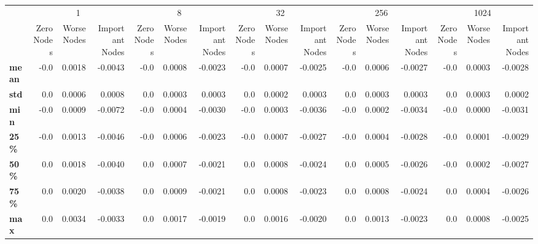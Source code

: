 \begin{tabular}{lrrrrrrrrrrrrrrr}
\toprule
{} & \multicolumn{3}{c}{1} & \multicolumn{3}{c}{8} & \multicolumn{3}{c}{32} & \multicolumn{3}{c}{256} & \multicolumn{3}{c}{1024} \\
{} & Zero Nodes & Worse Nodes & Important Nodes & Zero Nodes & Worse Nodes & Important Nodes & Zero Nodes & Worse Nodes & Important Nodes & Zero Nodes & Worse Nodes & Important Nodes & Zero Nodes & Worse Nodes & Important Nodes \\
\midrule
\textbf{mean} &       -0.0 &      0.0018 &         -0.0043 &       -0.0 &      0.0008 &         -0.0023 &       -0.0 &      0.0007 &         -0.0025 &       -0.0 &      0.0006 &         -0.0027 &       -0.0 &      0.0003 &         -0.0028 \\
\textbf{std } &        0.0 &      0.0006 &          0.0008 &        0.0 &      0.0003 &          0.0003 &        0.0 &      0.0002 &          0.0003 &        0.0 &      0.0003 &          0.0003 &        0.0 &      0.0003 &          0.0002 \\
\textbf{min } &       -0.0 &      0.0009 &         -0.0072 &       -0.0 &      0.0004 &         -0.0030 &       -0.0 &      0.0003 &         -0.0036 &       -0.0 &      0.0002 &         -0.0034 &       -0.0 &      0.0000 &         -0.0031 \\
\textbf{25\% } &       -0.0 &      0.0013 &         -0.0046 &       -0.0 &      0.0006 &         -0.0023 &       -0.0 &      0.0007 &         -0.0027 &       -0.0 &      0.0004 &         -0.0028 &       -0.0 &      0.0001 &         -0.0029 \\
\textbf{50\% } &        0.0 &      0.0018 &         -0.0040 &        0.0 &      0.0007 &         -0.0021 &        0.0 &      0.0008 &         -0.0024 &        0.0 &      0.0005 &         -0.0026 &       -0.0 &      0.0002 &         -0.0027 \\
\textbf{75\% } &        0.0 &      0.0020 &         -0.0038 &        0.0 &      0.0009 &         -0.0021 &        0.0 &      0.0008 &         -0.0023 &        0.0 &      0.0008 &         -0.0024 &        0.0 &      0.0004 &         -0.0026 \\
\textbf{max } &        0.0 &      0.0034 &         -0.0033 &        0.0 &      0.0017 &         -0.0019 &        0.0 &      0.0016 &         -0.0020 &        0.0 &      0.0013 &         -0.0023 &        0.0 &      0.0008 &         -0.0025 \\
\bottomrule
\end{tabular}
